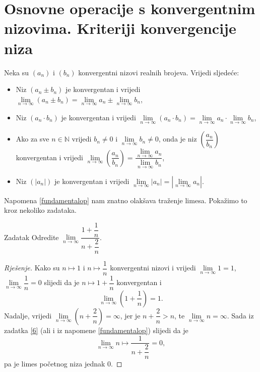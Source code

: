 \section{Osnovne operacije s konvergentnim nizovima. Kriteriji konvergencije niza}
\begin{remark}
\label{fundamentalop}
Neka su \((a_n)\) i \((b_n)\) konvergentni nizovi realnih brojeva. Vrijedi sljedeće:
\begin{itemize}
\item Niz \((a_n\pm b_n)\) je konvergentan i vrijedi \(\lim\limits_{n\to \infty}(a_n\pm b_n)=\lim\limits_{n\to \infty}{a_n}\pm \lim\limits_{n\to \infty}{b_n}\),

\item Niz \((a_n\cdot b_n)\) je konvergentan i vrijedi \(\lim\limits_{n\to \infty}(a_n\cdot b_n)=\lim\limits_{n\to \infty}{a_n}\cdot \lim\limits_{n\to \infty}{b_n}\),

\item Ako za sve \(n\in \mathbb{N}\) vrijedi \(b_n\neq 0\) i \(\lim\limits_{n\to \infty}{b_n}\neq 0\), onda je niz \(\left(\dfrac{a_n}{b_n}\right)\) konvergentan i vrijedi \(\lim\limits_{n\to \infty}\left(\dfrac{a_n}{b_n}\right)=\dfrac{\lim\limits_{n\to \infty}{a_n}}{\lim\limits_{n\to \infty}{b_n}}\),

\item Niz \(\left(|a_n|\right)\) je konvergentan i vrijedi \(\lim\limits_{n\to \infty}{|a_n|}=\left\lvert \lim\limits_{n\to \infty}{a_n}\right\rvert\).
\end{itemize}
\end{remark}
Napomena \ref{fundamentalop} nam znatno olakšava traženje limesa. Pokažimo to kroz nekoliko zadataka.
\begin{exercise}{Zadatak}
Odredite \(\lim\limits_{n\to \infty}{\dfrac{1+\dfrac{1}{n}}{n+\dfrac{2}{n}}}\).
\end{exercise}
\begin{proof}[Rješenje]
Kako su \(n\mapsto 1\) i \(n\mapsto \dfrac{1}{n}\) konvergentni nizovi i vrijedi \(\lim\limits_{n\to \infty}{1}=1\), \(\lim\limits_{n\to \infty}{\dfrac{1}{n}}=0\) slijedi da je \(n\mapsto 1+\dfrac{1}{n}\) konvergentan i \[\lim\limits_{n\to \infty}\left(1+\dfrac{1}{n}\right)=1.\] Nadalje, vrijedi \(\lim\limits_{n\to \infty}\left(n+\dfrac{2}{n}\right)=\infty\), jer je \(n+\dfrac{2}{n}>n\), te \(\lim\limits_{n\to \infty}{n}=\infty\). Sada iz zadatka \ref{6} (ali i iz napomene \ref{fundamentalop}) slijedi da je \[\lim\limits_{n\to \infty}{n\mapsto \dfrac{1}{n+\dfrac{2}{n}}}=0,\] pa je limes početnog niza jednak \(0\).
\end{proof}
